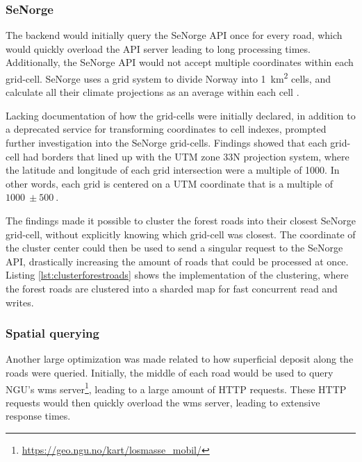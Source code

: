 \subsubsection{SeNorge}\label{subsubsec:implementation:optimization:senorge}

The backend would initially query the SeNorge API once for every road, which would quickly overload the API server leading to long processing times. Additionally, the SeNorge API would not accept multiple coordinates within each grid-cell. SeNorge uses a grid system to divide Norway into \qty{1}{\kilo\meter\squared} cells, and calculate all their climate projections as an average within each cell \cite{senorge_watermap}. 

Lacking documentation of how the grid-cells were initially declared, in addition to a deprecated service for transforming coordinates to cell indexes, prompted further investigation into the SeNorge grid-cells. Findings showed that each grid-cell had borders that lined up with the UTM zone 33N projection system, where the latitude and longitude of each grid intersection were a multiple of \qty{1000}{}. In other words, each grid is centered on a UTM coordinate that is a multiple of $\qty{1000}{}\pm\qty{500}{}$.

The findings made it possible to cluster the forest roads into their closest SeNorge grid-cell, without explicitly knowing which grid-cell was closest. The coordinate of the cluster center could then be used to send a singular request to the SeNorge API, drastically increasing the amount of roads that could be processed at once. Listing \ref{lst:clusterforestroads} shows the implementation of the clustering, where the forest roads are clustered into a sharded map for fast concurrent read and writes.

\begin{figure}[h]

\end{figure}

\subsubsection{Spatial querying}

Another large optimization was made related to how superficial deposit along the roads were queried. Initially, the middle of each road would be used to query NGU's \Gls{wms} server\footnote{\url{https://geo.ngu.no/kart/losmasse_mobil/}}, leading to a large amount of HTTP requests. These HTTP requests would then quickly overload the \Gls{wms} server, leading to extensive response times.

